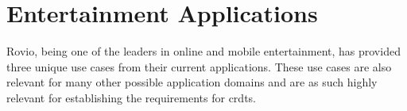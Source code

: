 \section{Entertainment Applications}
Rovio, being one of the leaders in online and mobile entertainment, has provided three unique use cases from their current applications. These use cases are also relevant for many other possible application domains and are as such highly relevant for establishing the requirements for \glspl{crdt}.

\ifnum{}
	\newpage
\fi


\ifnum{}
	\cleardoublepage
\fi


\ifnum{}
	\newpage
\fi

